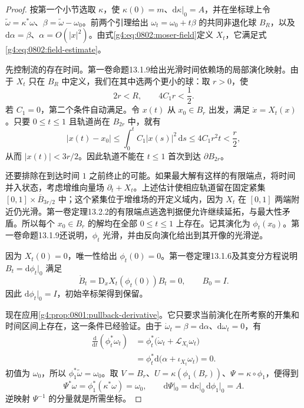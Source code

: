 \begin{proof}
	按第一个小节选取 \(\kappa\)，使 \(\kappa(0)=m\)、\(\mathrm{d}\kappa|_0=A\)，并在坐标球上令 \(\widetilde\omega=\kappa^*\omega\)、\(\beta=\widetilde\omega-\omega_0\)。前两个引理给出 \(\omega_t=\omega_0+t\beta\) 的共同非退化球 \(B_R\)，以及 \(\mathrm{d}\alpha=\beta\)、\(\alpha=O(|x|^2)\)。由式\eqref{g4:eq:0802:moser-field}定义 \(X_t\)，它满足式\eqref{g4:eq:0802:field-estimate}。

	先控制流的存在时间。第一卷命题13.1.9给出光滑时间依赖场的局部演化映射。由于 \(X_t\) 只在 \(B_R\) 中定义，我们在其中选两个更小的球：取 \(r>0\)，使
	\[
		2r<R,\qquad 4C_1r<\frac12.
	\]
	若 \(C_1=0\)，第二个条件自动满足。令 \(x(t)\) 从 \(x_0\in B_r\) 出发，满足 \(\dot x=X_t(x)\)。只要 \(0\le t\le1\) 且轨道尚在 \(B_{2r}\) 中，就有
	\[
		|x(t)-x_0|
		\le\int_0^t C_1|x(s)|^2\,\mathrm{d}s
		\le4C_1r^2t<\frac r2,
	\]
	从而 \(|x(t)|<3r/2\)。因此轨道不能在 \(t\le1\) 首次到达 \(\partial B_{2r}\)。

	还要排除在到达时间 \(1\) 之前终止的可能。如果最大解有这样的有限端点，将时间并入状态，考虑增维向量场 \(\partial_t+X_t\)。上述估计使相应轨道留在固定紧集 \([0,1]\times\overline B_{3r/2}\) 中；这个紧集位于增维场的开定义域内，因为 \(X_t\) 在 \([0,1]\) 两端附近仍光滑。第一卷定理13.2.2的有限端点逃逸判据便允许继续延拓，与最大性矛盾。所以每个 \(x_0\in B_r\) 的解均在全部 \(0\le t\le1\) 上存在。记其演化为 \(\phi_t(x_0)\)。第一卷命题13.1.9还说明，\(\phi_t\) 光滑，并由反向演化给出到其开像的光滑逆。

	因为 \(X_t(0)=0\)，唯一性给出 \(\phi_t(0)=0\)。第一卷定理13.1.6及其变分方程说明 \(B_t=\mathrm{d}\phi_t|_0\) 满足
	\[
		\dot B_t=\mathrm{D}_xX_t(\phi_t(0))B_t=0,
		\qquad B_0=I.
	\]
	因此 \(\mathrm{d}\phi_t|_0=I\)，初始辛标架得到保留。

	现在应用\cref{g4:prop:0801:pullback-derivative}。它只要求当前演化在所考察的开集和时间区间上存在，这一条件已经验证。由于 \(\dot\omega_t=\beta=\mathrm{d}\alpha\)、\(\mathrm{d}\omega_t=0\)，有
	\[
		\begin{aligned}
			\frac{\mathrm{d}}{\mathrm{d}t}(\phi_t^*\omega_t)
			&=\phi_t^*\bigl(\dot\omega_t+\mathcal L_{X_t}\omega_t\bigr)\\
			&=\phi_t^*\mathrm{d}\bigl(\alpha+\iota_{X_t}\omega_t\bigr)=0.
		\end{aligned}
	\]
	初值为 \(\omega_0\)，所以 \(\phi_1^*\widetilde\omega=\omega_0\)。取 \(V=B_r\)、\(U=\kappa(\phi_1(B_r))\)、\(\Psi=\kappa\circ\phi_1\)，便得到
	\[
		\Psi^*\omega=\phi_1^*(\kappa^*\omega)=\omega_0,\qquad
		\mathrm{d}\Psi|_0=\mathrm{d}\kappa|_0\,\mathrm{d}\phi_1|_0=A.
	\]
	逆映射 \(\Psi^{-1}\) 的分量就是所需坐标。
\end{proof}

